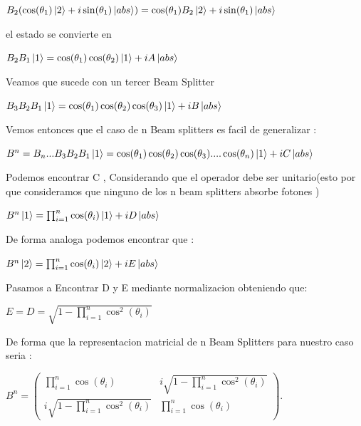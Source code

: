 \documentclass[11pt]{article}
\begin{document}
$B_{2}(\cos(\theta_{1})\ket{2}+i\sin(\theta_{1})\ket{abs})=\cos(\theta_{1})B_{2}\ket{2}+i\sin(\theta_{1})\ket{abs}$

el estado se convierte en 

$B_{2}B_{1}\ket{1}=\cos(\theta_{1})\cos(\theta_{2})\ket{1}+i A\ket{abs}$

Veamos que sucede con un tercer Beam Splitter


$B_{3}B_{2}B_{1}\ket{1}=\cos(\theta_{1})\cos(\theta_{2})\cos(\theta_{3})\ket{1}+iB\ket{abs}$

Vemos entonces que el caso de n Beam splitters es facil de generalizar :

$B^{n}=B_{n}...B_{3}B_{2}B_{1}\ket{1}=\cos(\theta_{1})\cos(\theta_{2})\cos(\theta_{3})....\cos(\theta_{n})\ket{1}+i C\ket{abs}$

Podemos encontrar C , Considerando que el operador debe ser unitario(esto por que consideramos que ninguno de los n beam splitters absorbe fotones )

$B^{n}\ket{1}=\prod_{i=1}^{n} \cos(\theta_{i})\ket{1}+i D\ket{abs}  $

De forma analoga podemos encontrar que :

$B^{n}\ket{2}=\prod_{i=1}^{n} \cos(\theta_{i})\ket{2}+i E\ket{abs}  $

Pasamos a Encontrar D y E mediante normalizacion obteniendo que:

$E=D=\sqrt{1-\prod_{i=1}^{n}\cos^2(\theta_{i})}$

De forma que la representacion matricial de n Beam Splitters para nuestro caso seria :


$B^{n}=\begin{pmatrix}\prod_{i=1}^{n} \cos(\theta_{i}) & i\sqrt{1-\prod_{i=1}^{n}\cos^2(\theta_{i})} \\i \sqrt{1-\prod_{i=1}^{n}\cos^2(\theta_{i})} & \prod_{i=1}^{n} \cos(\theta_{i}) \end{pmatrix}$.
\end{document}
